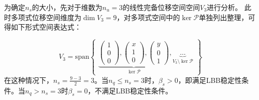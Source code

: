 为确定$n_s$的大小，先对于维数为$n_u=3$的线性完备位移空间空间$V_3$进行分析。
此时多项式位移空间维度为$\dim V_3 = 9$，对多项式空间中的$\ker \mathcal P$单独列出整理，可得如下形式空间表达式：

\begin{equation}\label{ch_5:eq:base}
    V_3 = \mathrm{span} 
    \begin{Bmatrix}
        \underbrace{
        \begin{pmatrix} 1 \\ 0 \\ 0 \end{pmatrix},
        \begin{pmatrix} x \\ 1 \\ 0 \end{pmatrix},
        \begin{pmatrix} y \\ 0 \\ 1 \end{pmatrix}
        }_{\ker \mathcal P},
        \underbrace{
            \dots
        }_{V_3\setminus \ker \mathcal P}
    \end{Bmatrix}
\end{equation}
在这种情况下，$n_s=\frac{9-3}{2} = 3$。当$n_q\le n_s=3$时，$\beta_s>0$，即满足LBB稳定性条件。当$n_q>n_s=3$时$\beta_s=0$，不满足LBB稳定性条件。

